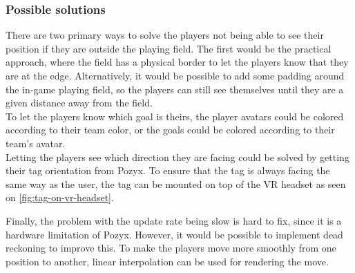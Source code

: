 \subsubsection{Possible solutions}
There are two primary ways to solve the players not being able to see their position if they are outside the playing field.
The first would be the practical approach, where the field has a physical border to let the players know that they are at the edge.
Alternatively, it would be possible to add some padding around the in-game playing field, so the players can still see themselves until they are a given distance away from the field.
\\
To let the players know which goal is theirs, the player avatars could be colored according to their team color, or the goals could be colored according to their team's avatar.
\\
Letting the players see which direction they are facing could be solved by getting their tag orientation from Pozyx.
To ensure that the tag is always facing the same way as the user, the tag can be mounted on top of the VR headset as seen on \autoref{fig:tag-on-vr-headset}.

Finally, the problem with the update rate being slow is hard to fix, since it is a hardware limitation of Pozyx. However, it would be possible to implement dead reckoning to improve this.
To make the players move more smoothly from one position to another, linear interpolation can be used for rendering the move.
